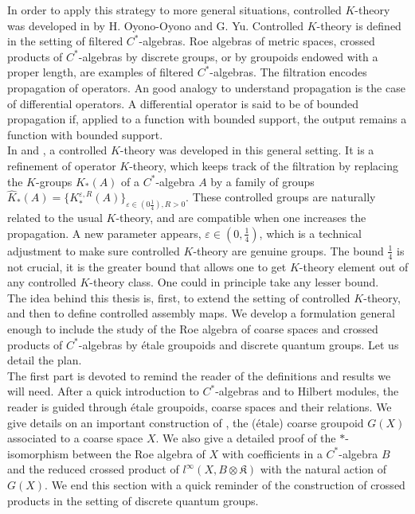In order to apply this strategy to more general situations, controlled $K$-theory was developed in \cite{OY2} by H. Oyono-Oyono and G. Yu. Controlled $K$-theory is defined in the setting of filtered $C^*$-algebras. Roe algebras of metric spaces, crossed products of $C^*$-algebras by discrete groups, or by groupoids endowed with a proper length, are examples of filtered $C^*$-algebras. The filtration encodes propagation of operators. An good analogy to understand propagation is the case of differential operators. A differential operator is said to be of bounded propagation if, applied to a function with bounded support, the output remains a function with bounded support.\\

In \cite{OY2} and \cite{OY3}, a controlled $K$-theory was developed in this general setting. It is a refinement of operator $K$-theory, which keeps track of the filtration by replacing the $K$-groups $K_*(A)$ of a $C^*$-algebra $A$ by a family of groups $\hat K_*(A)= \{K_*^{\varepsilon,R}(A)\}_{\varepsilon\in (0\frac{1}{4}),R>0}$. These controlled groups are naturally related to the usual $K$-theory, and are compatible when one increases the propagation. A new parameter appears, $\varepsilon\in (0 , \frac{1}{4})$, which is a technical adjustment to make sure controlled $K$-theory are genuine groups. The bound $\frac{1}{4}$ is not crucial, it is the greater bound that allows one to get $K$-theory element out of any controlled $K$-theory class. One could in principle take any lesser bound.\\ 


The idea behind this thesis is, first, to extend the setting of controlled $K$-theory, and then to define controlled assembly maps. We develop a formulation general enough to include the study of the Roe algebra of coarse spaces and crossed products of $C^*$-algebras by étale groupoids and discrete quantum groups. Let us detail the plan.\\ 

The first part is devoted to remind the reader of the definitions and results we will need. After a quick introduction to $C^*$-algebras and to Hilbert modules, the reader is guided through étale groupoids, coarse spaces and their relations. We give details on an important construction of \cite{SkTuYu}, the (étale) coarse groupoid $G(X)$ associated to a coarse space $X$. We also give a detailed proof of the $*$-isomorphism between the Roe algebra of $X$ with coefficients in a $C^*$-algebra $B$ and the reduced crossed product of $l^\infty (X,B\otimes\mathfrak K)$ with the natural action of $G(X)$. We end this section with a quick reminder of the construction of crossed products in the setting of discrete quantum groups.\\
 
